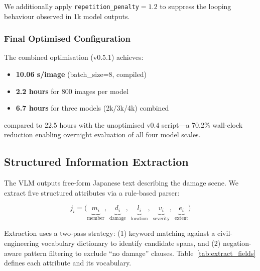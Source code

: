\documentclass[twocolumn]{article}
\begin{document}
We additionally apply \texttt{repetition\_penalty}$=1.2$ to suppress
the looping behaviour observed in 1k model outputs.

\subsubsection{Final Optimised Configuration}

The combined optimisation (v0.5.1) achieves:
\begin{itemize}[leftmargin=*,itemsep=1pt]
  \item \textbf{10.06 s/image} (batch\_size=8, compiled)
  \item \textbf{2.2 hours} for 800 images per model
  \item \textbf{6.7 hours} for three models (2k/3k/4k) combined
\end{itemize}

compared to 22.5 hours with the unoptimised v0.4 script---a 70.2\% wall-clock
reduction enabling overnight evaluation of all four model scales.

\subsection{Structured Information Extraction}
\label{sec:extraction}

The VLM outputs free-form Japanese text describing the damage scene.
We extract five structured attributes via a rule-based parser:

\begin{equation}
  j_i = \bigl(\underbrace{m_i}_{\text{member}},\;
               \underbrace{d_i}_{\text{damage}},\;
               \underbrace{l_i}_{\text{location}},\;
               \underbrace{v_i}_{\text{severity}},\;
               \underbrace{e_i}_{\text{extent}}\bigr)
  \label{eq:struct}
\end{equation}

Extraction uses a two-pass strategy: (1) keyword matching against a
civil-engineering vocabulary dictionary to identify candidate spans, and
(2) negation-aware pattern filtering to exclude ``no damage'' clauses.
Table~\ref{tab:extract_fields} defines each attribute and its vocabulary.
\end{document}
